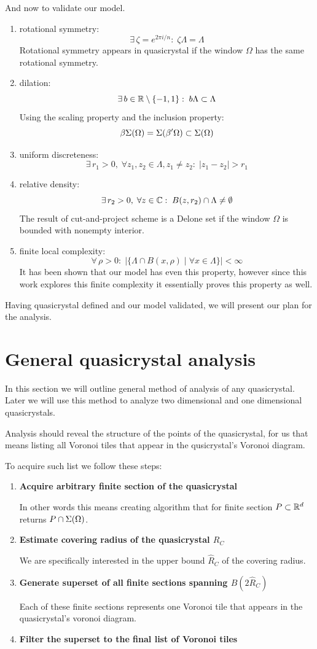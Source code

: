 \documentclass[text.tex]{subfiles}
\begin{document}
And now to validate our model. 

\begin{enumerate}
\item rotational symmetry: $$\exists\,\zeta = e^{2\pi i/n}:\; \zeta\Lambda = \Lambda$$
Rotational symmetry appears in quasicrystal if the window $\Omega$ has the same rotational symmetry.
\item dilation: $$\exists\,b\in\mathbb{R}\setminus\{-1,1\}:\; b\Lambda\subset \Lambda$$
Using the scaling property and the inclusion property:
$$\beta\Sigma(\Omega) = \Sigma(\beta'\Omega) \subset \Sigma(\Omega)$$
\item uniform discreteness: $$\exists\,r_1>0,\; \forall z_1,z_2\in\Lambda, z_1\neq z_2:\; |z_1-z_2|>r_1$$
\item relative density: $$\exists\,r_2>0,\; \forall z\in\mathbb{C}:\; B(z,r_2)\cap\Lambda \neq \emptyset$$
The result of cut-and-project scheme is a Delone set if the window $\Omega$ is bounded with nonempty interior. 
\item finite local complexity: $$\forall\,\rho>0:\;\big|\{\Lambda\cap B(x,\rho)\;|\;\forall x\in\Lambda\}\big| < \infty$$
It has been shown that our model has even this property, however since this work explores this finite complexity it essentially proves this property as well. 
\end{enumerate}

Having quasicrystal defined and  our model validated, we will present our plan for the analysis. 

\section{General quasicrystal analysis}
In this section we will outline general method of analysis of any quasicrystal. Later we will use this method to analyze two dimensional and one dimensional quasicrystals. 

Analysis should reveal the structure of the points of the quasicrystal, for us that means listing all Voronoi tiles that appear in the qusicrystal's Voronoi diagram. 

To acquire such list we follow these steps: 
\begin{enumerate}
\item \textbf{Acquire arbitrary finite section of the quasicrystal}

In other words this means creating algorithm that for finite section $P\subset\mathbb{R}^d$ returns $P\cap\Sigma(\Omega)$. 
\item \textbf{Estimate covering radius of the quasicrystal $R_C$}

We are specifically interested in the upper bound $\hat{R}_C$ of the covering radius. 
\item \textbf{Generate superset of all finite sections spanning $B(2\hat{R}_C)$}

Each of these finite sections represents one Voronoi tile that appears in the quasicrystal's voronoi diagram. 
\item \textbf{Filter the superset to the final list of Voronoi tiles}
\end{enumerate}
\end{document}
